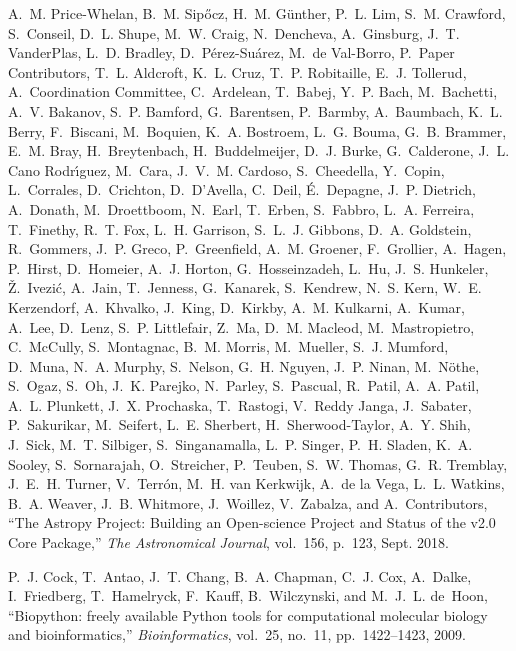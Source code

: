 \documentclass[twocolumn]{article}
\begin{document}
\begin{thebibliography}{10}
A.~M. {Price-Whelan}, B.~M. {Sip{\H{o}}cz}, H.~M. {G{\"u}nther}, P.~L. {Lim},
  S.~M. {Crawford}, S.~{Conseil}, D.~L. {Shupe}, M.~W. {Craig}, N.~{Dencheva},
  A.~{Ginsburg}, J.~T. {VanderPlas}, L.~D. {Bradley},
  D.~{P{\'e}rez-Su{\'a}rez}, M.~{de Val-Borro}, P.~{Paper Contributors}, T.~L.
  {Aldcroft}, K.~L. {Cruz}, T.~P. {Robitaille}, E.~J. {Tollerud},
  A.~{Coordination Committee}, C.~{Ardelean}, T.~{Babej}, Y.~P. {Bach},
  M.~{Bachetti}, A.~V. {Bakanov}, S.~P. {Bamford}, G.~{Barentsen}, P.~{Barmby},
  A.~{Baumbach}, K.~L. {Berry}, F.~{Biscani}, M.~{Boquien}, K.~A. {Bostroem},
  L.~G. {Bouma}, G.~B. {Brammer}, E.~M. {Bray}, H.~{Breytenbach},
  H.~{Buddelmeijer}, D.~J. {Burke}, G.~{Calderone}, J.~L. {Cano
  Rodr{\'\i}guez}, M.~{Cara}, J.~V.~M. {Cardoso}, S.~{Cheedella}, Y.~{Copin},
  L.~{Corrales}, D.~{Crichton}, D.~{D{\textquoteright}Avella}, C.~{Deil},
  {\'E}.~{Depagne}, J.~P. {Dietrich}, A.~{Donath}, M.~{Droettboom}, N.~{Earl},
  T.~{Erben}, S.~{Fabbro}, L.~A. {Ferreira}, T.~{Finethy}, R.~T. {Fox}, L.~H.
  {Garrison}, S.~L.~J. {Gibbons}, D.~A. {Goldstein}, R.~{Gommers}, J.~P.
  {Greco}, P.~{Greenfield}, A.~M. {Groener}, F.~{Grollier}, A.~{Hagen},
  P.~{Hirst}, D.~{Homeier}, A.~J. {Horton}, G.~{Hosseinzadeh}, L.~{Hu}, J.~S.
  {Hunkeler}, {\v{Z}}.~{Ivezi{\'c}}, A.~{Jain}, T.~{Jenness}, G.~{Kanarek},
  S.~{Kendrew}, N.~S. {Kern}, W.~E. {Kerzendorf}, A.~{Khvalko}, J.~{King},
  D.~{Kirkby}, A.~M. {Kulkarni}, A.~{Kumar}, A.~{Lee}, D.~{Lenz}, S.~P.
  {Littlefair}, Z.~{Ma}, D.~M. {Macleod}, M.~{Mastropietro}, C.~{McCully},
  S.~{Montagnac}, B.~M. {Morris}, M.~{Mueller}, S.~J. {Mumford}, D.~{Muna},
  N.~A. {Murphy}, S.~{Nelson}, G.~H. {Nguyen}, J.~P. {Ninan}, M.~{N{\"o}the},
  S.~{Ogaz}, S.~{Oh}, J.~K. {Parejko}, N.~{Parley}, S.~{Pascual}, R.~{Patil},
  A.~A. {Patil}, A.~L. {Plunkett}, J.~X. {Prochaska}, T.~{Rastogi}, V.~{Reddy
  Janga}, J.~{Sabater}, P.~{Sakurikar}, M.~{Seifert}, L.~E. {Sherbert},
  H.~{Sherwood-Taylor}, A.~Y. {Shih}, J.~{Sick}, M.~T. {Silbiger},
  S.~{Singanamalla}, L.~P. {Singer}, P.~H. {Sladen}, K.~A. {Sooley},
  S.~{Sornarajah}, O.~{Streicher}, P.~{Teuben}, S.~W. {Thomas}, G.~R.
  {Tremblay}, J.~E.~H. {Turner}, V.~{Terr{\'o}n}, M.~H. {van Kerkwijk}, A.~{de
  la Vega}, L.~L. {Watkins}, B.~A. {Weaver}, J.~B. {Whitmore}, J.~{Woillez},
  V.~{Zabalza}, and A.~{Contributors}, ``{The Astropy Project: Building an
  Open-science Project and Status of the v2.0 Core Package},'' {\em The
  Astronomical Journal}, vol.~156, p.~123, Sept. 2018.

P.~J. Cock, T.~Antao, J.~T. Chang, B.~A. Chapman, C.~J. Cox, A.~Dalke,
  I.~Friedberg, T.~Hamelryck, F.~Kauff, B.~Wilczynski, and M.~J.~L. de~Hoon,
  ``Biopython: freely available {Python} tools for computational molecular
  biology and bioinformatics,'' {\em Bioinformatics}, vol.~25, no.~11,
  pp.~1422--1423, 2009.


\end{thebibliography}
\end{document}
